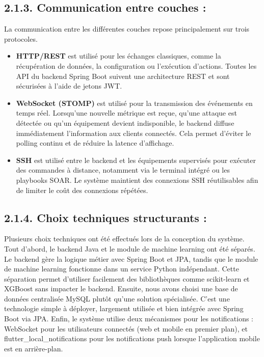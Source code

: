 \documentclass[12pt,a4paper]{report}
\begin{document}
\subsection*{2.1.3. Communication entre couches :}
La communication entre les différentes couches repose principalement sur trois protocoles.\par
\begin{itemize}[leftmargin=1.2cm,itemsep=0.25em]
\item \textbf{HTTP/REST} est utilisé pour les échanges classiques, comme la récupération de données, la configuration ou l’exécution d’actions. Toutes les API du backend Spring Boot suivent une architecture REST et sont sécurisées à l’aide de jetons JWT.
\item \textbf{WebSocket (STOMP)} est utilisé pour la transmission des événements en temps réel. Lorsqu’une nouvelle métrique est reçue, qu’une attaque est détectée ou qu’un équipement devient indisponible, le backend diffuse immédiatement l’information aux clients connectés. Cela permet d’éviter le polling continu et de réduire la latence d’affichage.
\item \textbf{SSH} est utilisé entre le backend et les équipements supervisés pour exécuter des commandes à distance, notamment via le terminal intégré ou les playbooks SOAR. Le système maintient des connexions SSH réutilisables afin de limiter le coût des connexions répétées.
\end{itemize}
\subsection*{2.1.4. Choix techniques structurants :}
Plusieurs choix techniques ont été effectués lors de la conception du système. Tout d’abord, le backend Java et le module de machine learning ont été séparés. Le backend gère la logique métier avec Spring Boot et JPA, tandis que le module de machine learning fonctionne dans un service Python indépendant. Cette séparation permet d’utiliser facilement des bibliothèques comme scikit-learn et XGBoost sans impacter le backend. Ensuite, nous avons choisi une base de données centralisée MySQL plutôt qu’une solution spécialisée. C’est une technologie simple à déployer, largement utilisée et bien intégrée avec Spring Boot via JPA. Enfin, le système utilise deux mécanismes pour les notifications : WebSocket pour les utilisateurs connectés (web et mobile en premier plan), et flutter\_local\_notifications pour les notifications push lorsque l’application mobile est en arrière-plan.\par
\end{document}
